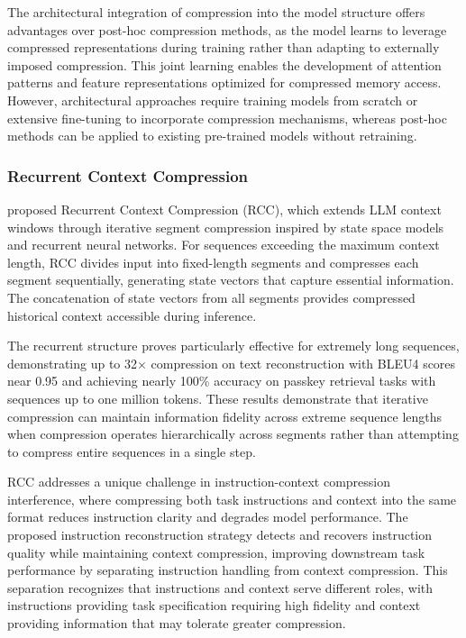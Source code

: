 The architectural integration of compression into the model structure offers advantages over post-hoc compression methods, as the model learns to leverage compressed representations during training rather than adapting to externally imposed compression. This joint learning enables the development of attention patterns and feature representations optimized for compressed memory access. However, architectural approaches require training models from scratch or extensive fine-tuning to incorporate compression mechanisms, whereas post-hoc methods can be applied to existing pre-trained models without retraining.

\subsubsection{Recurrent Context Compression}

\citet{ge2024recurrent} proposed Recurrent Context Compression (RCC), which extends LLM context windows through iterative segment compression inspired by state space models and recurrent neural networks. For sequences exceeding the maximum context length, RCC divides input into fixed-length segments and compresses each segment sequentially, generating state vectors that capture essential information. The concatenation of state vectors from all segments provides compressed historical context accessible during inference.

The recurrent structure proves particularly effective for extremely long sequences, demonstrating up to 32$\times$ compression on text reconstruction with BLEU4 scores near 0.95 and achieving nearly 100\% accuracy on passkey retrieval tasks with sequences up to one million tokens. These results demonstrate that iterative compression can maintain information fidelity across extreme sequence lengths when compression operates hierarchically across segments rather than attempting to compress entire sequences in a single step.

RCC addresses a unique challenge in instruction-context compression interference, where compressing both task instructions and context into the same format reduces instruction clarity and degrades model performance. The proposed instruction reconstruction strategy detects and recovers instruction quality while maintaining context compression, improving downstream task performance by separating instruction handling from context compression. This separation recognizes that instructions and context serve different roles, with instructions providing task specification requiring high fidelity and context providing information that may tolerate greater compression.

